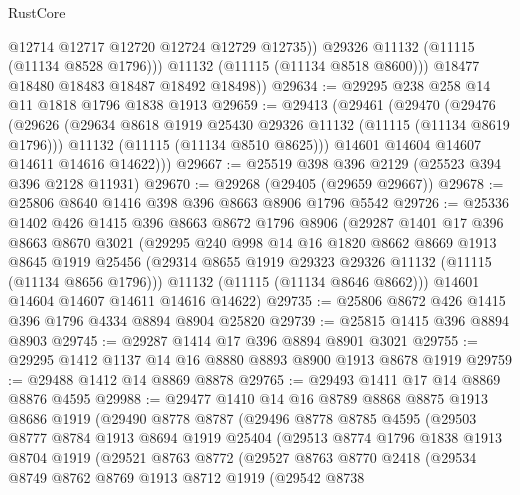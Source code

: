 \begin{lexlean}{RustCore}
\begin{coremodule}
                @12714
                @12717
                @12720
                @12724
                @12729
                @12735))
            @29326
            @11132
            (@11115 (@11134 @8528 @1796)))
          @11132
          (@11115 (@11134 @8518 @8600)))
        @18477
        @18480
        @18483
        @18487
        @18492
        @18498))
@29634 := @29295 @238 @258 @14 @11 @1818 @1796 @1838 @1913
@29659 := @29413
    (@29461
      (@29470
        (@29476
          (@29626
            (@29634 @8618 @1919 @25430 @29326 @11132 (@11115 (@11134 @8619 @1796)))
            @11132
            (@11115 (@11134 @8510 @8625)))
          @14601
          @14604
          @14607
          @14611
          @14616
          @14622)))
@29667 := @25519 @398 @396 @2129 (@25523 @394 @396 @2128 @11931)
@29670 := @29268 (@29405 (@29659 @29667))
@29678 := @25806 @8640 @1416 @398 @396 @8663 @8906 @1796 @5542
@29726 := @25336
    @1402
    @426
    @1415
    @396
    @8663
    @8672
    @1796
    @8906
    (@29287
      @1401
      @17
      @396
      @8663
      @8670
      @3021
      (@29295
        @240
        @998
        @14
        @16
        @1820
        @8662
        @8669
        @1913
        @8645
        @1919
        @25456
        (@29314 @8655 @1919 @29323 @29326 @11132 (@11115 (@11134 @8656 @1796)))
        @11132
        (@11115 (@11134 @8646 @8662)))
      @14601
      @14604
      @14607
      @14611
      @14616
      @14622)
@29735 := @25806 @8672 @426 @1415 @396 @1796 @4334 @8894 @8904 @25820
@29739 := @25815 @1415 @396 @8894 @8903
@29745 := @29287 @1414 @17 @396 @8894 @8901 @3021
@29755 := @29295 @1412 @1137 @14 @16 @8880 @8893 @8900 @1913 @8678 @1919
@29759 := @29488 @1412 @14 @8869 @8878
@29765 := @29493 @1411 @17 @14 @8869 @8876 @4595
@29988 := @29477
    @1410
    @14
    @16
    @8789
    @8868
    @8875
    @1913
    @8686
    @1919
    (@29490
      @8778
      @8787
      (@29496
        @8778
        @8785
        @4595
        (@29503
          @8777
          @8784
          @1913
          @8694
          @1919
          @25404
          (@29513
            @8774
            @1796
            @1838
            @1913
            @8704
            @1919
            (@29521
              @8763
              @8772
              (@29527
                @8763
                @8770
                @2418
                (@29534
                  @8749
                  @8762
                  @8769
                  @1913
                  @8712
                  @1919
                  (@29542
                    @8738

\end{coremodule}
\end{lexlean}
